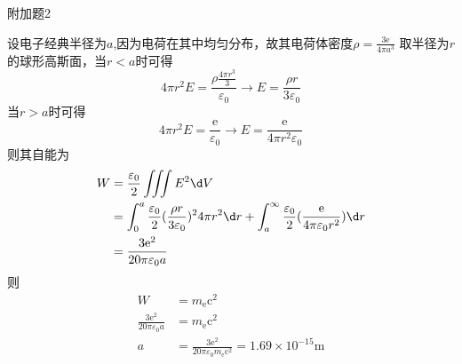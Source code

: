 \documentclass{phyasgn}
\begin{document}
{\heiti\color{red} 附加题2}
\begin{sol}
设电子经典半径为$a$,因为电荷在其中均匀分布，故其电荷体密度$\rho=\frac{3\mathrm{e}}{4\pi a^3}$
取半径为$r$的球形高斯面，当$r<a$时可得
$$4\pi r^2E=\frac{\rho \frac{4\pi r^3}{3}}{\varepsilon_0}\to E=\frac{\rho r}{3\varepsilon_0}$$
当$r>a$时可得
$$4\pi r^2E=\frac{\mathrm{e}}{\varepsilon_0}\to E=\frac{\mathrm{e}}{4\pi r^2\varepsilon_0}$$
则其自能为
$$\begin{aligned}
  W&=\frac{\varepsilon_0}{2}\iiint E^2\d V\\
  &=\int_0^a \frac{\varepsilon_0}{2}(\frac{\rho r}{3\varepsilon_0})^24\pi r^2\d r+\int_a^{\infty}\frac{\varepsilon_0}{2}(\frac{\mathrm{e}}{4\pi\varepsilon_0 r^2})\d r\\
  &=\frac{3\mathrm{e}^2}{20\pi\varepsilon_0 a}
\end{aligned}$$
则
$$\begin{aligned}
  W&=m_{\mathrm{e}}\mathrm{c}^2\\
  \frac{3\mathrm{e}^2}{20\pi\varepsilon_0 a}&=m_{\mathrm{e}}\mathrm{c}^2\\
  a&=\frac{3\mathrm{e}^2}{20\pi\varepsilon_0 m_{\mathrm{e}}\mathrm{c}^2}=1.69\times 10^{-15}\mathrm{m}
\end{aligned}$$
\end{sol}\par
\end{document}
